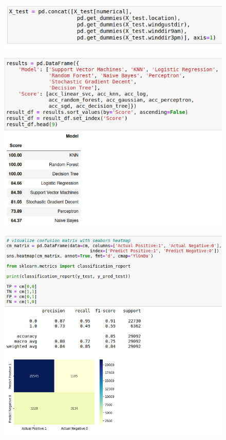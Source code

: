 \documentclass{beamer}
\begin{document}
\begin{frame}[plain]
    \begin{figure}
        \includegraphics[width=\textwidth]{images/get_dummies.png}
    \end{figure}
\end{frame}

\begin{frame}[plain]
    \begin{figure}
        \includegraphics[width=\textwidth]{images/best_model.png}
    \end{figure}
\end{frame}

\begin{frame}[plain]
    \begin{figure}
        \includegraphics[width=.9\textwidth]{images/confusion_heatmap.png}
    \end{figure}
\end{frame}
\end{document}

